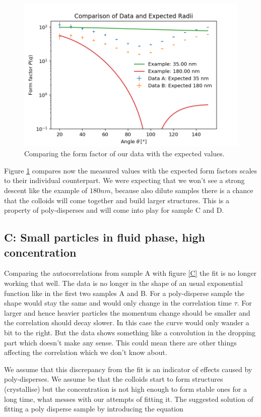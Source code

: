 \documentclass[]{article}
\begin{document}
\begin{figure}[!htbp]
\centering
\includegraphics[width=0.8\linewidth]{Plots/Comparison.png}
\caption{Comparing the form factor of our data with the expected values.}
\label{AB comparison}
\end{figure}

Figure \ref{AB comparison} compares now the measured values with the expected form factors scales to their individual counterpart.
We were expecting that we won't see a strong descent like the example of $180nm$, because also dilute samples there is a chance that the colloids will come together and build larger structures. This is a property of poly-disperses and will come into play for sample C and D. 


\subsection{C: Small particles in fluid phase, high concentration}
Comparing the autocorrelations from sample A with figure \ref{C} the fit is no longer working that well. The data is no longer in the shape of an usual exponential function like in the first two samples A and B. For a poly-disperse sample the shape would stay the same and would only change in the correlation time $\tau$. For larger and hence heavier particles the momentum change should be smaller and the correlation should decay slower. In this case the curve would only wander a bit to the right. But the data shows something like a convolution in the dropping part which doesn't make any sense. This could mean there are other things affecting the correlation which we don't know about.

We assume that this discrepancy from the fit is an indicator of effects caused by poly-disperses. We assume be that the colloids start to form structures (crystallise) but the concentration is not high enough to form stable ones for a long time, what messes with our attempts of fitting it. The suggested solution of fitting a poly disperse sample by introducing the equation 
\end{document}
